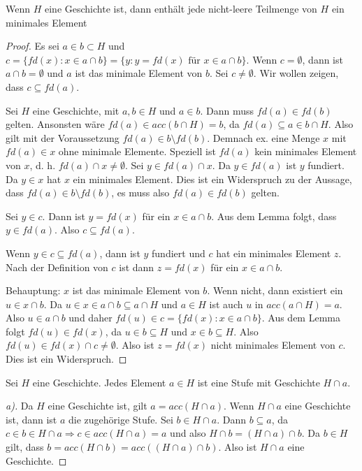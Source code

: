 \begin{satz}
	Wenn $H$ eine Geschichte ist, dann enthält jede nicht-leere Teilmenge von $H$ ein minimales Element
\end{satz}
\begin{proof}
	Es sei $a\in b \subset H$ und $c=\{fd(x) : x \in a\cap b\}=\{y:y=fd(x)\text{ für } x\in a \cap b\}$.
	Wenn $c=\emptyset$, dann ist $a\cap b = \emptyset$ und $a$ ist das minimale Element von $b$.
	Sei $c\neq \emptyset$. Wir wollen zeigen, dass $c\subseteq fd(a)$.
	
	\begin{lemma}
		Sei $H$ eine Geschichte, mit $a,b\in H$ und $a\in b$. Dann muss $fd(a)\in fd(b)$ gelten. Ansonsten wäre $fd(a)\in acc(b\cap H)=b$, da $fd(a)\subseteq a \in b \cap H$. Also gilt mit der Voraussetzung $fd(a)\in b \setminus fd(b)$. Demnach ex. eine Menge $x$ mit $fd(a)\in x$ ohne minimale Elemente. Speziell ist $fd(a)$ kein minimales Element von $x$, d. h. $fd(a)\cap x \neq \emptyset$. Sei $y\in fd(a)\cap x$. Da $y\in fd(a)$ ist $y$ fundiert. Da $y \in x$ hat $x$ ein minimales Element. Dies ist ein Widerspruch zu der Aussage, dass $fd(a)\in b \setminus fd(b)$, es muss also $fd(a)\in fd(b)$ gelten.
	\end{lemma}

	Sei $y\in c$. Dann ist $y = fd(x)$ für ein $x\in a\cap b$. Aus dem Lemma folgt, dass $y\in fd(a)$. Also $c\subseteq fd(a)$.
	
	Wenn $y\in c \subseteq fd(a)$, dann ist $y$ fundiert und $c$ hat ein minimales Element $z$. Nach der Definition von $c$ ist dann $z=fd(x)$ für ein $x\in a\cap b$.
	
	Behauptung: $x$ ist das minimale Element von $b$. Wenn nicht, dann existiert ein $u \in x \cap b$. Da $u \in x \in a\cap b\subseteq a\cap H$ und $a\in H$ ist auch $u$ in $acc(a\cap H)=a$. Also $u \in a\cap b$ und daher $fd(u)\in c = \{fd(x):x\in a\cap b\}$. Aus dem Lemma folgt $fd(u)\in fd(x)$, da $u\in b \subseteq H$ und $x\in b \subseteq H$. Also $fd(u)\in fd(x)\cap c \neq \emptyset$. Also ist $z=fd(x)$ nicht minimales Element von $c$. Dies ist ein Widerspruch.
\end{proof}

\begin{satz}
	Sei $H$ eine Geschichte. Jedes Element $a\in H$ ist eine Stufe mit Geschichte $H\cap a$.
	\label{ElementVonGeschichteIstStufe}
\end{satz}
\begin{proof}[a)]
	Da $H$ eine Geschichte ist, gilt $a=acc(H\cap a)$. Wenn $H\cap a$ eine Geschichte ist, dann ist $a$ die zugehörige Stufe. Sei $b\in H \cap a$. Dann $b\subseteq a$, da $c\in b \in H\cap a \Rightarrow c \in acc(H\cap a)=a$ und also $H\cap b = (H\cap a)\cap b$. Da $b\in H$ gilt, dass $b=acc(H\cap b) = acc((H\cap a)\cap b)$. Also ist $H\cap a$ eine Geschichte.
\end{proof}

